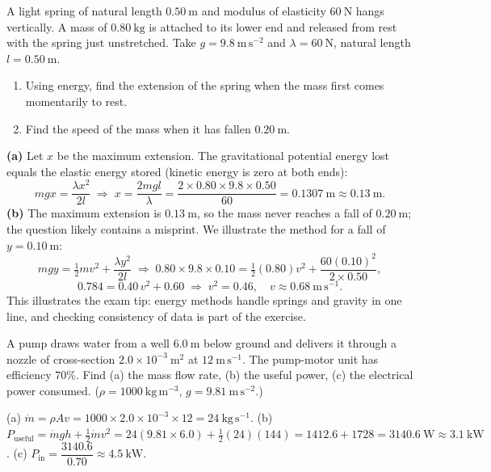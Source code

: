\documentclass[11pt]{article}
\begin{document}
\begin{exoresolu}
A light spring of natural length $0.50\ \mathrm{m}$ and modulus of elasticity $60\ \mathrm{N}$ hangs vertically. A mass of $0.80\ \mathrm{kg}$ is attached to its lower end and released from rest with the spring just unstretched. Take $g = 9.8\ \mathrm{m\,s^{-2}}$ and $\lambda = 60\ \mathrm{N}$, natural length $l = 0.50\ \mathrm{m}$.
\begin{enumerate}
\item[(a)] Using energy, find the extension of the spring when the mass first comes momentarily to rest.
\item[(b)] Find the speed of the mass when it has fallen $0.20\ \mathrm{m}$.
\end{enumerate}
\tcblower
\textbf{(a)} Let $x$ be the maximum extension. The gravitational potential energy lost equals the elastic energy stored (kinetic energy is zero at both ends):
\[
mgx = \frac{\lambda x^{2}}{2l} \;\Longrightarrow\; x = \frac{2mgl}{\lambda} = \frac{2 \times 0.80 \times 9.8 \times 0.50}{60} = 0.1307\ \mathrm{m} \approx 0.13\ \mathrm{m}.
\]
\textbf{(b)} The maximum extension is $0.13\ \mathrm{m}$, so the mass never reaches a fall of $0.20\ \mathrm{m}$; the question likely contains a misprint. We illustrate the method for a fall of $y = 0.10\ \mathrm{m}$:
\[
mgy = \tfrac{1}{2}mv^{2} + \frac{\lambda y^{2}}{2l}
\;\Longrightarrow\;
0.80 \times 9.8 \times 0.10 = \tfrac{1}{2}(0.80)v^{2} + \frac{60(0.10)^{2}}{2 \times 0.50},
\]
\[
0.784 = 0.40\,v^{2} + 0.60 \;\Longrightarrow\; v^{2} = 0.46, \quad v \approx 0.68\ \mathrm{m\,s^{-1}}.
\]
This illustrates the exam tip: energy methods handle springs and gravity in one line, and checking consistency of data is part of the exercise.
\end{exoresolu}

\begin{exercice}
A pump draws water from a well $6.0\ \mathrm{m}$ below ground and delivers it through a nozzle of cross-section $2.0\times10^{-3}\ \mathrm{m^{2}}$ at $12\ \mathrm{m\,s^{-1}}$. The pump-motor unit has efficiency $70\%$. Find (a) the mass flow rate, (b) the useful power, (c) the electrical power consumed. ($\rho = 1000\ \mathrm{kg\,m^{-3}}$, $g = 9.81\ \mathrm{m\,s^{-2}}$.)
\end{exercice}

\begin{corrige}[Exercise 1]
(a) $\dot{m} = \rho A v = 1000 \times 2.0\times10^{-3} \times 12 = 24\ \mathrm{kg\,s^{-1}}$.
(b) $P_{\text{useful}} = \dot{m}gh + \tfrac{1}{2}\dot{m}v^{2} = 24(9.81\times 6.0) + \tfrac{1}{2}(24)(144) = 1412.6 + 1728 = 3140.6\ \mathrm{W} \approx 3.1\ \mathrm{kW}$.
(c) $P_{\text{in}} = \dfrac{3140.6}{0.70} \approx 4.5\ \mathrm{kW}$.
\end{corrige}
\end{document}
